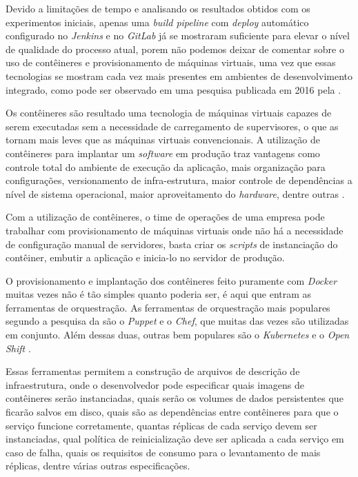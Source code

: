\documentclass[
	12pt,				%
	openright,			%
	oneside,			%
	a4paper,			%
	english,			%
	french,				%
	spanish,			%
	brazil,				%
	]{abntex2}
\begin{document}
Devido a limitações de tempo e analisando os resultados obtidos com os experimentos iniciais, apenas uma \textit{build pipeline} com \textit{deploy} automático configurado no \textit{Jenkins} e no \textit{GitLab} já se mostraram suficiente para elevar o nível de qualidade do processo atual, porem não podemos deixar de comentar sobre o uso de contêineres e provisionamento de máquinas virtuais, uma vez que essas tecnologias se mostram cada vez mais presentes em ambientes de desenvolvimento integrado, como pode ser observado em uma pesquisa publicada em 2016 pela .

Os contêineres são resultado uma tecnologia de máquinas virtuais capazes de serem executadas sem a necessidade de carregamento de supervisores, o que as tornam mais leves que as máquinas virtuais convencionais. A utilização de contêineres para implantar um \textit{software} em produção traz vantagens como controle total do ambiente de execução da aplicação, mais organização para configurações, versionamento de infra-estrutura, maior controle de dependências a nível de sistema operacional, maior aproveitamento do \textit{hardware}, dentre outras \cite{JamesTurbull:DockerBook}.

Com a utilização de contêineres, o time de operações de uma empresa pode trabalhar com provisionamento de máquinas virtuais onde não há a necessidade de configuração manual de servidores, basta criar os \textit{scripts} de instanciação do contêiner, embutir a aplicação e inicia-lo no servidor de produção.

O provisionamento e implantação dos contêineres feito puramente com \textit{Docker} muitas vezes não é tão simples quanto poderia ser, é aqui que entram as ferramentas de orquestração. As ferramentas de orquestração mais populares segundo a pesquisa da  são o \textit{Puppet} e o \textit{Chef}, que muitas das vezes são utilizadas em conjunto. Além dessas duas, outras bem populares são o 
\textit{Kubernetes} \cite{Kubernetes:Orchestration} e o \textit{Open Shift} \cite{OpenShift:Orchestration}.

Essas ferramentas permitem a construção de arquivos de descrição de infraestrutura, onde o desenvolvedor pode especificar quais imagens de contêineres serão instanciadas, quais serão os volumes de dados persistentes que ficarão salvos em disco, quais são as dependências entre contêineres para que o serviço funcione corretamente, quantas réplicas de cada serviço devem ser instanciadas, qual política de reinicialização deve ser aplicada a cada serviço em caso de falha, quais os requisitos de consumo para o levantamento de mais réplicas, dentre várias outras especificações.
\end{document}
